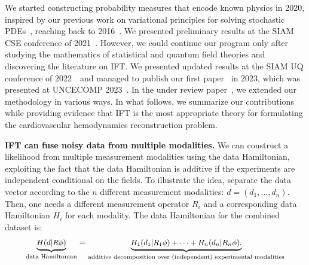 We started constructing probability measures that encode known physics in 2020, inspired by our previous work on variational principles for solving stochastic PDEs~\cite{karumuri_simulator-free_2020}, reaching back to 2016~\cite{bilionis2016probabilistic}.
We presented preliminary results at the SIAM CSE conference of 2021~\cite{AlbertsBilionis2021}.
However, we could continue our program only after studying the mathematics of statistical and quantum field theories and discovering the literature on IFT.
We presented updated results at the SIAM UQ conference of 2022~\cite{AlbertsBilionis2022}~and managed to publish our first paper~\cite{alberts2023physics} in 2023, which was presented at UNCECOMP 2023~\cite{AlbertsBilionis2023}.
In the under review paper~\cite{hao2023information}, we extended our methodology in various ways.
In what follows, we summarize our contributions while providing evidence that IFT is the most appropriate theory for formulating the cardiovascular
hemodynamics reconstruction problem.

\textbf{IFT can fuse noisy data from multiple modalities.}
We can construct a likelihood from multiple measurement modalities using the data Hamiltonian, exploiting the fact that the data Hamiltonian is additive if the experiments are independent conditional on the fields.
To illustrate the idea, separate the data vector according to the $n$ different measurement modalities: $d = (d_1,\dots, d_n)$.
Then, one needs a different measurement operator $R_i$ and a corresponding data Hamiltonian $H_i$ for each modality.
The data Hamiltonian for the combined dataset is:
\begin{equation}
\small
    \underbrace{H(d|R\phi)}_{\text{data Hamiltonian}} = \underbrace{H_1(d_1|R_1\phi)+\dots + H_n(d_n|R_n\phi).}_{\text{additive decomposition over (independent) experimental modalities}}
    \label{eqn:data_hamiltonian}
\end{equation}

